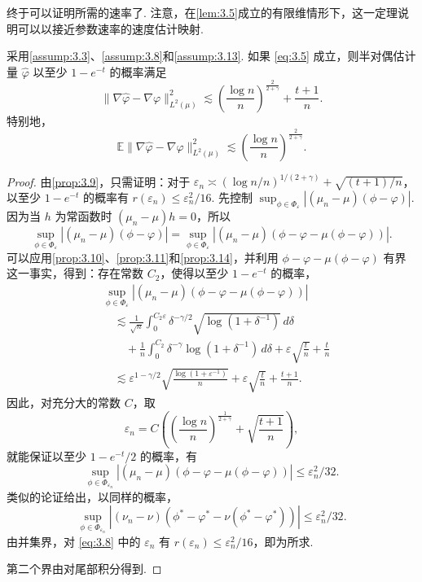 终于可以证明所需的速率了. 注意，在\autoref{lem:3.5}成立的有限维情形下，这一定理说明可以以接近参数速率的速度估计映射.
\begin{theorem}\label{thm:3.15}
采用\autoref{assump:3.3}、\autoref{assump:3.8}和\autoref{assump:3.13}. 如果 \eqref{eq:3.5} 成立，则半对偶估计量 $\widehat\varphi$ 以至少 $1-e^{-t}$ 的概率满足
\begin{equation}\label{eq:3.7}
\|\nabla\widehat\varphi-\nabla\varphi\|_{L^2(\mu)}^2
\lesssim\left(\frac{\log n}n\right)^{\frac2{2+\gamma}}+\frac{t+1}n.
\end{equation}
特别地，
$$\mathbb E\|\nabla\widehat\varphi-\nabla\varphi\|_{L^2(\mu)}^2
\lesssim\left(\frac{\log n}n\right)^{\frac2{2+\gamma}}.$$
\end{theorem}
\begin{proof}
由\autoref{prop:3.9}，只需证明：对于 $\varepsilon_n\asymp(\log n/n)^{1/(2+\gamma)}+\sqrt{(t+1)/n}$，以至少 $1-e^{-t}$ 的概率有 $r(\varepsilon_n)\le\varepsilon_n^2/16$. 先控制 $\sup_{\phi\in\Phi_\varepsilon}|(\mu_n-\mu)(\phi-\varphi)|$. 因为当 $h$ 为常函数时 $(\mu_n-\mu)h=0$，所以
$$\sup_{\phi\in\Phi_\varepsilon}|(\mu_n-\mu)(\phi-\varphi)|
=\sup_{\phi\in\Phi_\varepsilon}|(\mu_n-\mu)(\phi-\varphi-\mu(\phi-\varphi))|.$$
可以应用\autoref{prop:3.10}、\autoref{prop:3.11}和\autoref{prop:3.14}，并利用 $\phi-\varphi-\mu(\phi-\varphi)$ 有界这一事实，得到：存在常数 $C_2$，使得以至少 $1-e^{-t}$ 的概率，
$$\begin{aligned}
&\sup_{\phi\in\Phi_\varepsilon}|(\mu_n-\mu)(\phi-\varphi-\mu(\phi-\varphi))|\\
&\quad\lesssim\frac1{\sqrt n}\int_0^{C_2\varepsilon}
\delta^{-\gamma/2}\sqrt{\log(1+\delta^{-1})}\,d\delta\\
&\qquad+\frac1n\int_0^{C_2}\delta^{-\gamma}\log(1+\delta^{-1})\,d\delta
+\varepsilon\sqrt{\frac tn}+\frac tn\\
&\quad\lesssim\varepsilon^{1-\gamma/2}\sqrt{\frac{\log(1+\varepsilon^{-1})}n}
+\varepsilon\sqrt{\frac tn}+\frac{t+1}n.
\end{aligned}$$
因此，对充分大的常数 $C$，取
\begin{equation}\label{eq:3.8}
\varepsilon_n=C\left(\left(\frac{\log n}n\right)^{\frac1{2+\gamma}}
+\sqrt{\frac{t+1}n}\right),
\end{equation}
就能保证以至少 $1-e^{-t}/2$ 的概率，有
$$\sup_{\phi\in\Phi_{\varepsilon_n}}|(\mu_n-\mu)(\phi-\varphi-\mu(\phi-\varphi))|
\le\varepsilon_n^2/32.$$
类似的论证给出，以同样的概率，
$$\sup_{\phi\in\Phi_{\varepsilon_n}}|(\nu_n-\nu)(\phi^*-\varphi^*-\nu(\phi^*-\varphi^*))|
\le\varepsilon_n^2/32.$$
由并集界，对 \eqref{eq:3.8} 中的 $\varepsilon_n$ 有 $r(\varepsilon_n)\le\varepsilon_n^2/16$，即为所求.

第二个界由对尾部积分得到.
\end{proof}

